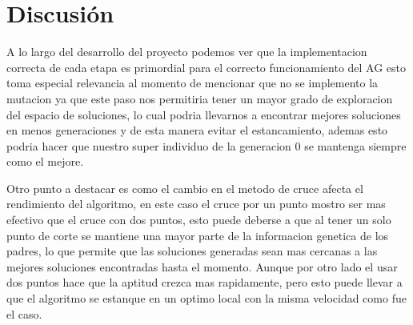 \section{Discusión}

A lo largo del desarrollo del proyecto podemos ver que la implementacion correcta de cada etapa es primordial para el correcto funcionamiento
del AG esto toma especial relevancia al momento de mencionar que no se implemento la mutacion ya que este paso nos permitiria tener un mayor
grado de exploracion del espacio de soluciones, lo cual podria llevarnos a encontrar mejores soluciones en menos generaciones y de esta manera
evitar el estancamiento, ademas esto podria hacer que nuestro super individuo de la generacion 0 se mantenga siempre como el mejore.

Otro punto a destacar es como el cambio en el metodo de cruce afecta el rendimiento del algoritmo, en este caso el cruce por un punto
mostro ser mas efectivo que el cruce con dos puntos, esto puede deberse a que al tener un solo punto de corte se mantiene una mayor 
parte de la informacion genetica de los padres, lo que permite que las soluciones generadas sean mas cercanas a las mejores soluciones 
encontradas hasta el momento. Aunque por otro lado el usar dos puntos hace que la aptitud crezca mas rapidamente, pero esto puede llevar a que
el algoritmo se estanque en un optimo local con la misma velocidad como fue el caso.